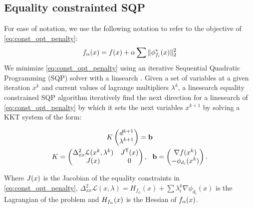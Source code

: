 \subsection{Equality constrainted SQP}
For ease of notation, we use the following notation to refer to the objective of \eqref{eq:const_opt_penalty}:
\begin{equation}
f_\alpha(x) = f(x) + \alpha \sum \|\phi^*_{f_i}(x)\|_2^2
\end{equation}
We minimize \eqref{eq:const_opt_penalty} using an iterative Sequential Quadratic Programming (SQP) solver with a linsearch \cite{nocedal}. Given a set of variables at a given iteration $x^k$ and current values of lagrange multipliers $\lambda^k$, a linesearch equality constrained SQP algorithm iteratively find the next direction for a linesearch of \eqref{eq:const_opt_penalty} by which it sets the next variables $x^{k+1}$ by solving a KKT system of the form:

\begin{equation} \label{eq:KKT_eps}
\begin{gathered}
{K} \begin{pmatrix} d^{k+1} \\ \lambda^{k+1} \end{pmatrix}=\mathbf{b} \\
{K}=\begin{pmatrix}
{\Delta^2_{xx}\mathcal{L}(x^k,\lambda^k)} & {J^\tr}(x)\\
{J(x)} &  0 \\
\end{pmatrix}, \ \ 
\mathbf{b}=\begin{pmatrix}
{\nabla f(x^k)} \\ 
-\phi_{d_i}(x^k)\\
\end{pmatrix}.
\end{gathered}
\end{equation}

Where $J(x)$ is the Jacobian of the equality constraints in \eqref{eq:const_opt_penalty}, $\Delta^2_{xx}\mathcal{L}(x,\lambda) = H_{f_\alpha}(x)+\sum\lambda_i^{k} \nabla \phi_{d_i}(x)$ is the Lagrangian of the problem and $H_{f_\alpha}(x)$ is the Hessian of $f_\alpha(x)$.

 
